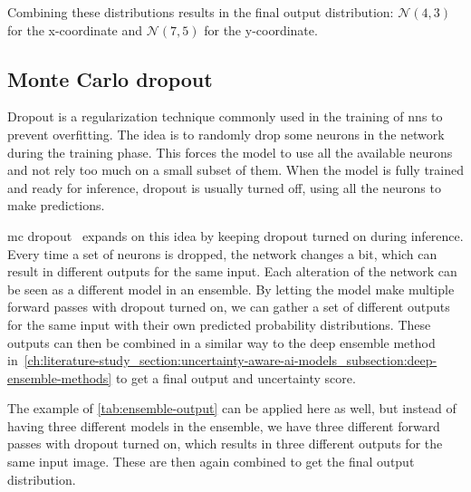 Combining these distributions results in the final output distribution: $\mathcal{N}(4, 3)$ for the x-coordinate and $\mathcal{N}(7, 5)$ for the y-coordinate.

\subsection{Monte Carlo dropout} \label{ch:literature-study_section:uncertainty-aware-ai-models_subsection:monte-carlo-dropout}
Dropout is a regularization technique commonly used in the training of \glspl{nn} to prevent overfitting.
The idea is to randomly drop some neurons in the network during the training phase.
This forces the model to use all the available neurons and not rely too much on a small subset of them.
When the model is fully trained and ready for inference, dropout is usually turned off, using all the neurons to make predictions.

\gls{mc} dropout~\cite{src:mc-dropout} expands on this idea by keeping dropout turned on during inference.
Every time a set of neurons is dropped, the network changes a bit, which can result in different outputs for the same input.
Each alteration of the network can be seen as a different model in an ensemble.
By letting the model make multiple forward passes with dropout turned on, we can gather a set of different outputs for the same input with their own predicted probability distributions.
These outputs can then be combined in a similar way to the deep ensemble method in~\cref{ch:literature-study_section:uncertainty-aware-ai-models_subsection:deep-ensemble-methods} to get a final output and uncertainty score.

The example of \cref{tab:ensemble-output} can be applied here as well, but instead of having three different models in the ensemble, we have three different forward passes with dropout turned on, which results in three different outputs for the same input image.
These are then again combined to get the final output distribution.
